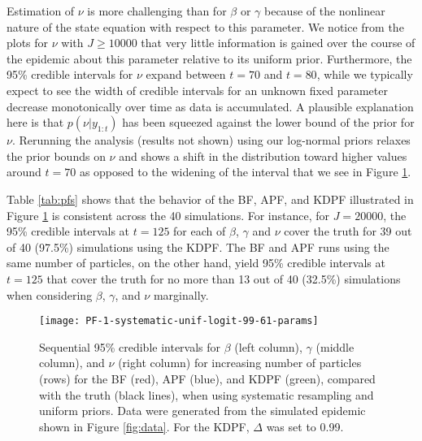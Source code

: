 \documentclass{elsarticle}
\begin{document}
Estimation of $\nu$ is more challenging than for $\beta$ or $\gamma$ because of the nonlinear nature of the state equation with respect to this parameter. We notice from the plots for $\nu$ with $J \ge 10000$ that very little information is gained over the course of the epidemic about this parameter relative to its uniform prior. Furthermore, the 95\% credible intervals for $\nu$ expand between $t = 70$ and $t = 80$, while we typically expect to see the width of credible intervals for an unknown fixed parameter decrease monotonically over time as data is accumulated. A plausible explanation here is that $p(\nu|y_{1:t})$ has been squeezed against the lower bound of the prior for $\nu$. Rerunning the analysis (results not shown) using our log-normal priors relaxes the prior bounds on $\nu$ and shows a shift in the distribution toward higher values around $t = 70$ as opposed to the widening of the interval that we see in Figure \ref{fig:pfs}.

Table \ref{tab:pfs} shows that the behavior of the BF, APF, and KDPF illustrated in Figure \ref{fig:pfs} is consistent across the 40 simulations. For instance, for $J = 20000$, the 95\% credible intervals at $t = 125$ for each of $\beta$, $\gamma$ and $\nu$ cover the truth for 39 out of 40 (97.5\%) simulations using the KDPF. The BF and APF runs using the same number of particles, on the other hand, yield 95\% credible intervals at $t = 125$ that cover the truth for no more than 13 out of 40 (32.5\%) simulations when considering $\beta$, $\gamma$, and $\nu$ marginally.

\begin{figure}
\centering
\texttt{[image: PF-1-systematic-unif-logit-99-61-params]}
\caption{Sequential 95\% credible intervals for $\beta$ (left column), $\gamma$ (middle column), and $\nu$ (right column) for increasing number of particles (rows) for the BF (red), APF (blue), and KDPF (green), compared with the truth (black lines), when using systematic resampling and uniform priors. Data were generated from the simulated epidemic shown in Figure \ref{fig:data}. For the KDPF, $\Delta$ was set to 0.99. } \label{fig:pfs}
\end{figure}
\end{document}
